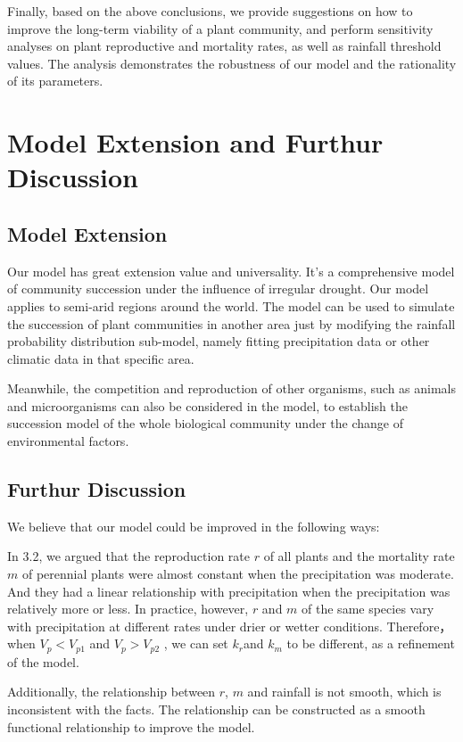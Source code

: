 \documentclass{mcmthesis}
\begin{document}
Finally, based on the above conclusions, we provide suggestions on how to improve the long-term viability of a plant community, and perform sensitivity analyses on plant reproductive and mortality rates, as well as rainfall threshold values. The analysis demonstrates the robustness of our model and the rationality of its parameters.


\section{Model Extension and Furthur Discussion}

\subsection{Model Extension}
Our model has great extension value and universality. It’s a comprehensive model of community succession under the influence of irregular drought. Our model applies to semi-arid regions around the world. The model can be used to simulate the succession of plant communities in another area just by modifying the rainfall probability distribution sub-model, namely fitting precipitation data or other climatic data in that specific area.

Meanwhile, the competition and reproduction of other organisms, such as animals and microorganisms can also be considered in the model, to establish the succession model of the whole biological community under the change of environmental factors.

\subsection{Furthur Discussion}

We believe that our model could be improved in the following ways: 

In 3.2, we argued that the reproduction rate $r$ of all plants and the mortality rate $m$ of perennial plants were almost constant when the precipitation was moderate. And they had a linear relationship with precipitation when the precipitation was relatively more or less. In practice, however, $r$ and $m$ of the same species vary with precipitation at different rates under drier or wetter conditions. Therefore，when $V_p<V_{p1}$ and $V_p>V_{p2}$ , we can set $k_r$and  $k_m$ to be different, as a refinement of the model.

Additionally, the relationship between $r$, $m$ and rainfall is not smooth, which is inconsistent with the facts. The relationship can be constructed as a smooth functional relationship to improve the model.
\end{document}
